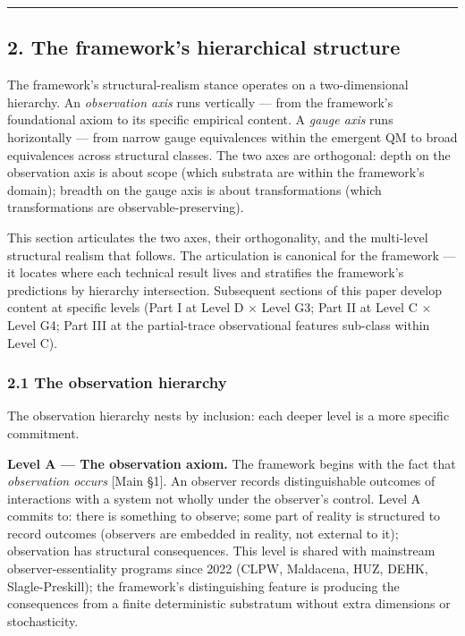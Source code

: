 \documentclass[
]{article}
\begin{document}
\begin{center}\rule{0.5\linewidth}{0.5pt}\end{center}

\hypertarget{the-frameworks-hierarchical-structure}{%
\subsection{2. The framework's hierarchical
structure}\label{the-frameworks-hierarchical-structure}}

The framework's structural-realism stance operates on a two-dimensional
hierarchy. An \emph{observation axis} runs vertically --- from the
framework's foundational axiom to its specific empirical content. A
\emph{gauge axis} runs horizontally --- from narrow gauge equivalences
within the emergent QM to broad equivalences across structural classes.
The two axes are orthogonal: depth on the observation axis is about
scope (which substrata are within the framework's domain); breadth on
the gauge axis is about transformations (which transformations are
observable-preserving).

This section articulates the two axes, their orthogonality, and the
multi-level structural realism that follows. The articulation is
canonical for the framework --- it locates where each technical result
lives and stratifies the framework's predictions by hierarchy
intersection. Subsequent sections of this paper develop content at
specific levels (Part I at Level D × Level G3; Part II at Level C ×
Level G4; Part III at the partial-trace observational features sub-class
within Level C).

\hypertarget{the-observation-hierarchy}{%
\subsubsection{2.1 The observation
hierarchy}\label{the-observation-hierarchy}}

The observation hierarchy nests by inclusion: each deeper level is a
more specific commitment.

\textbf{Level A --- The observation axiom.} The framework begins with
the fact that \emph{observation occurs} {[}Main §1{]}. An observer
records distinguishable outcomes of interactions with a system not
wholly under the observer's control. Level A commits to: there is
something to observe; some part of reality is structured to record
outcomes (observers are embedded in reality, not external to it);
observation has structural consequences. This level is shared with
mainstream observer-essentiality programs since 2022 (CLPW, Maldacena,
HUZ, DEHK, Slagle-Preskill); the framework's distinguishing feature is
producing the consequences from a finite deterministic substratum
without extra dimensions or stochasticity.
\end{document}
